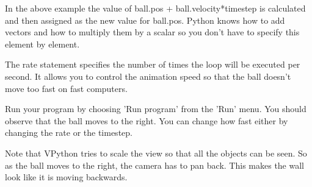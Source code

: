 \documentclass[12pt]{article}
\begin{document}
In the above example the value of {\color{code}ball.pos + ball.velocity*timestep}
is calculated and then assigned as the new value
for {\color{code}ball.pos}.
Python knows how to add vectors and how to multiply them by a scalar so you don't have
to specify this element by element.

The rate statement specifies the number of times the loop will be executed per second.
It allows you to control the animation speed so that the ball doesn't move too fast on fast computers.

Run your program by choosing 'Run program' from the 'Run' menu.
You should observe that the ball moves to the right.
You can change how fast either by changing the rate or the timestep.

Note that VPython tries to scale the view so that all the objects can be seen.
So as the ball moves to the right, the camera has to pan back. This makes
the wall look like it is moving backwards.
\end{document}
